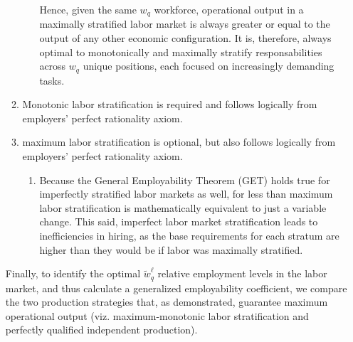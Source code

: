 \documentclass[hidelinks, nonatbib]{elsarticle}
\begin{document}
\begin{enumerate}
\begin{enumerate}
\begin{enumerate}
            Hence, given the same $w_q$ workforce, operational output in a maximally stratified labor market is always greater or equal to the output of any other economic configuration. It is, therefore, always optimal to monotonically and maximally stratify responsabilities across $w_q$ unique positions, each focused on increasingly demanding tasks.
        \end{enumerate}
        \item Monotonic labor stratification is required and follows logically from employers' perfect rationality axiom.
        \item maximum labor stratification is optional, but also follows logically from employers' perfect rationality axiom.
        \begin{enumerate}
            \item Because the General Employability Theorem (GET) holds true for imperfectly stratified labor markets as well, for less than maximum labor stratification is mathematically equivalent to just a variable change. This said, imperfect labor market stratification leads to inefficiencies in hiring, as the base requirements for each stratum are higher than they would be if labor was maximally stratified.
        \end{enumerate}
    \end{enumerate}

    Finally, to identify the optimal $\tilde{w}_{q}^{\ell}$ relative employment levels in the labor market, and thus calculate a generalized employability coefficient, we compare the two production strategies that, as demonstrated, guarantee maximum operational output (viz. maximum-monotonic labor stratification and perfectly qualified independent production).


\end{enumerate}
\end{document}
